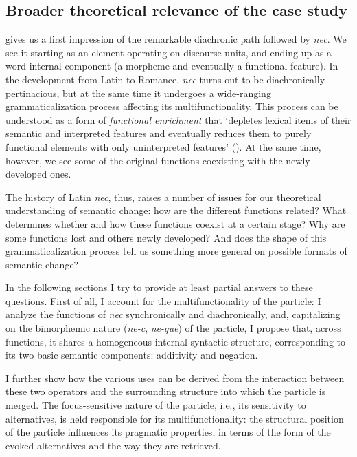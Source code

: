 \documentclass[output=paper,modfonts,nonflat,citecolor=brown,
showindex
]{langsci/langscibook}
\begin{document}
\subsection{Broader theoretical relevance of the case study} \label{theoreticalrelevance}

 gives us a first impression of the remarkable diachronic path followed by {\emph{nec}}. We see it starting as an element operating on discourse units, and ending up as a word-internal component (a morpheme and eventually a functional feature). In the development from Latin to Romance, {\emph{nec}} turns out to be diachronically pertinacious, but at the same time it undergoes a wide-ranging grammaticalization process affecting its multifunctionality. This process can be understood as a form of {\emph{functional enrichment}} that `depletes lexical items of their semantic and interpreted features and eventually reduces them to purely functional elements with only uninterpreted features' (\citealt[73]{Kiparsky15}). At the same time, however, we see some of the original functions coexisting with the newly developed ones.

The history of Latin {\emph{nec}}, thus, raises a number of issues for our theoretical understanding of semantic change: how are the different functions related? What determines whether and how these functions coexist at a certain stage? Why are some functions lost and others newly developed? And does the shape of this grammaticalization process tell us something more general on possible formats of semantic change?

In the following sections I try to provide at least partial answers to these questions. First of all, I account for the multifunctionality of the particle: I analyze the functions of {\emph{nec}} synchronically and diachronically, and, capitalizing on the bimorphemic nature ({\emph{ne-c}}, {\emph{ne-que}}) of the particle, I propose that, across functions, it shares a homogeneous internal syntactic structure, corresponding to its two basic semantic components: additivity and negation.

I further show how the various uses can be derived from the interaction between these two operators and the surrounding structure into which the particle is merged. The focus-sensitive nature of the particle, i.e., its sensitivity to alternatives, is held responsible for its multifunctionality: the structural position of the particle influences its pragmatic properties, in terms of the form of the evoked alternatives and the way they are retrieved.
\end{document}
